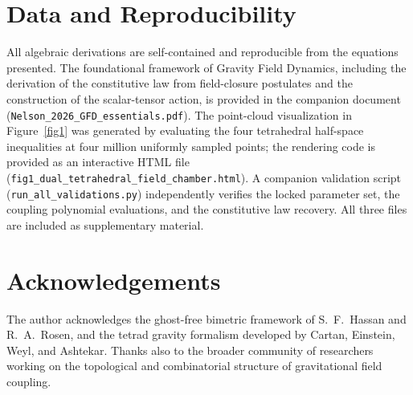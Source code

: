 \documentclass[twocolumn]{iopjournal}
\begin{document}

\section*{Data and Reproducibility}

All algebraic derivations are self-contained and reproducible from the equations presented. The foundational framework of Gravity Field Dynamics, including the derivation of the constitutive law from field-closure postulates and the construction of the scalar-tensor action, is provided in the companion document (\texttt{Nelson\_2026\_GFD\_essentials.pdf}). The point-cloud visualization in Figure~\ref{fig1} was generated by evaluating the four tetrahedral half-space inequalities at four million uniformly sampled points; the rendering code is provided as an interactive HTML file (\texttt{fig1\_dual\_tetrahedral\_field\_chamber.html}). A companion validation script (\texttt{run\_all\_validations.py}) independently verifies the locked parameter set, the coupling polynomial evaluations, and the constitutive law recovery. All three files are included as supplementary material.


\section*{Acknowledgements}

The author acknowledges the ghost-free bimetric framework of S.~F.~Hassan and R.~A.~Rosen, and the tetrad gravity formalism developed by Cartan, Einstein, Weyl, and Ashtekar. Thanks also to the broader community of researchers working on the topological and combinatorial structure of gravitational field coupling.

\end{document}
